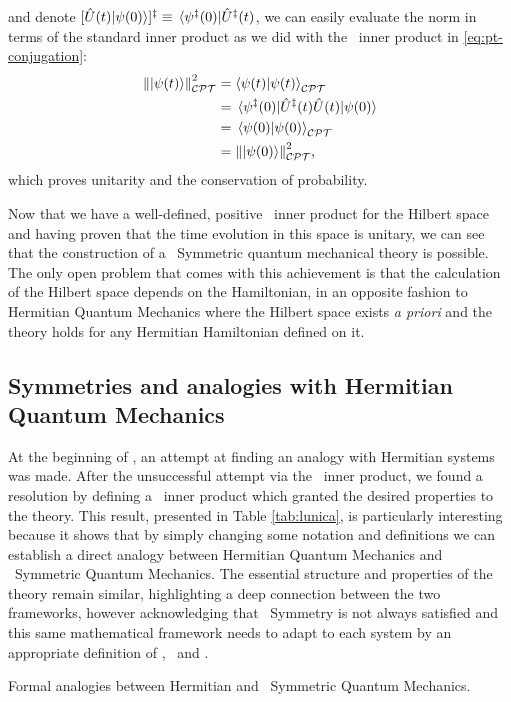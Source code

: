             and denote $\bqty*{\hU\pqty{t}\!\ket{\psi\pqty{0}}}\!^\myconj \equiv \bra*{\psi^\myconj\pqty{0}}\!\hU^\myconj\pqty{t}$, we can easily evaluate the norm in terms of the standard inner product as we did with the \PT\ inner product in \eqref{eq:pt-conjugation}:
            \begin{align*}
                \norm{\ket{\psi\pqty{t}}}^2_{\CPT}
                &= \braket{\psi{\pqty{t}}}{\psi\pqty{t}}_{\CPT} \\
                &= \bra*{\psi^\myconj\pqty{0}}\! \hU^\myconj\pqty{t} \hU\pqty{t} \!\ket{\psi\pqty{0}} \\
                &= \bra*{\psi\pqty{0}}\ket{\psi\pqty{0}}_{\CPT} \\
                &= \norm{\ket{\psi\pqty{0}}}^2_{\CPT}
                \mycomma
            \end{align*}
            which proves unitarity and the conservation of probability.

            Now that we have a well-defined, positive \CPT\ inner product for the Hilbert space and having proven that the time evolution in this space is unitary, we can see that the construction of a \PT\ Symmetric quantum mechanical theory is possible. The only open problem that comes with this achievement is that the calculation of the Hilbert space depends on the Hamiltonian, in an opposite fashion to Hermitian Quantum Mechanics where the Hilbert space exists \emph{a priori} and the theory holds for any Hermitian Hamiltonian defined on it.

        \subsection{Symmetries and analogies with Hermitian Quantum Mechanics}
        At the beginning of , an attempt at finding an analogy with Hermitian systems was made. After the unsuccessful attempt via the \PT\ inner product, we found a resolution by defining a \CPT\ inner product which granted the desired properties to the theory. This result, presented in Table \ref{tab:lunica}, is particularly interesting because it shows that by simply changing some notation and definitions we can establish a direct analogy between Hermitian Quantum Mechanics and \PT\ Symmetric Quantum Mechanics. The essential structure and properties of the theory remain similar, highlighting a deep connection between the two frameworks, however acknowledging that \PT\ Symmetry is not always satisfied and this same mathematical framework needs to adapt to each system by an appropriate definition of \hC, \hP\ and \hT.
        \begin{table}
            \centering
            \label{tab:lunica}
            
            \caption{Formal analogies between Hermitian and \PT\ Symmetric Quantum Mechanics.}
        \end{table}